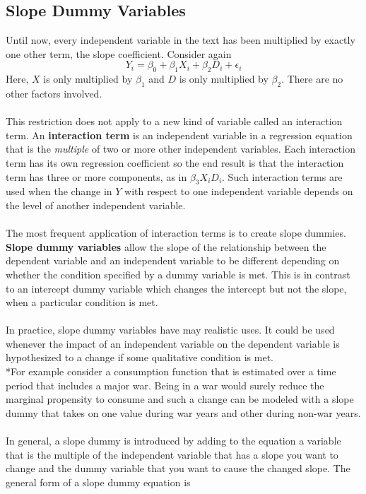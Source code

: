 \documentclass[11pt]{article}
\begin{document}
\subsection{Slope Dummy Variables}
Until now, every independent variable in the text has been multiplied by exactly one other term, the slope coefficient. Consider again
\begin{equation*}
Y_i = \beta_0 + \beta_1X_i + \beta_2D_i + \epsilon_i 
\end{equation*}
Here, $X$ is only multiplied by $\beta_1$ and $D$ is only multiplied by $\beta_2$. There are no other factors involved. \\ \\
This restriction does not apply to a new kind of variable called an interaction term. An \textbf{interaction term} is an independent variable in a regression equation that is the \textit{multiple} of two or more other independent variables. Each interaction term has its own regression coefficient so the end result is that the interaction term has three or more components, as in $\beta_3X_iD_i$. Such interaction terms are used when the change in $Y$ with respect to one independent variable depends on the level of another independent variable. \\ \\
The most frequent application of interaction terms is to create slope dummies. \textbf{Slope dummy variables} allow the slope of the relationship between the dependent variable and an independent variable to be different depending on whether the condition specified by a dummy variable is met. This is in contrast to an intercept dummy variable which changes the intercept but not the slope, when a particular condition is met.\\ \\
In practice, slope dummy variables have may realistic uses. It could be used whenever the impact of an independent variable on the dependent variable is hypothesized to a change if some qualitative condition is met. \\*For example consider a consumption function that is estimated over a time period that includes a major war. Being in a war would surely reduce the marginal propensity to consume and such a change can be modeled with a slope dummy that takes on one value during war years and other during non-war years.\\ \\
In general, a slope dummy is introduced by adding to the equation a variable that is the multiple of the independent variable that has a slope you want to change and the dummy variable that you want to cause the changed slope. The general form of a slope dummy equation is
\end{document}
